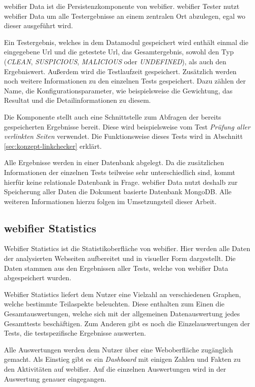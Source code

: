 webifier Data ist die Persistenzkomponente von webifier. webifier Tester nutzt webifier Data um alle Testergebnisse an einem zentralen Ort abzulegen, egal wo dieser ausgeführt wird.

Ein Testergebnis, welches in dem Datamodul gespeichert wird enthält einmal die eingegebene Url und die getestete Url, das Gesamtergebnis, sowohl den Typ (\textit{CLEAN}, \textit{SUSPICIOUS}, \textit{MALICIOUS} oder \textit{UNDEFINED}), als auch den Ergebniswert. Außerdem wird die Testlaufzeit gespeichert. Zusätzlich werden noch weitere Informationen zu den einzelnen Tests gespeichert. Dazu zählen der Name, die Konfigurationsparameter, wie beispielsweise die Gewichtung, das Resultat und die Detailinformationen zu diesem.

Die Komponente stellt auch eine Schnittstelle zum Abfragen der bereits gespeicherten Ergebnisse bereit. Diese wird beispielsweise vom Test \textit{Prüfung aller verlinkten Seiten} verwendet. Die Funktionsweise dieses Tests wird in Abschnitt \ref{sec:konzept-linkchecker} erklärt.

Alle Ergebnisse werden in einer Datenbank abgelegt. Da die zusätzlichen Informationen der einzelnen Tests teilweise sehr unterschiedlich sind, kommt hierfür keine relationale Datenbank in Frage. webifier Data nutzt deshalb zur Speicherung aller Daten die Dokument basierte Datenbank MongoDB. Alle weiteren Informationen hierzu folgen im Umsetzungsteil dieser Arbeit.

\subsection{webifier Statistics}
Webifier Statistics ist die Statistikoberfläche von webifier. Hier werden alle Daten der analysierten Webseiten aufbereitet und in visueller Form dargestellt. Die Daten stammen aus den Ergebnissen aller Tests, welche von webifier Data abgespeichert wurden.

Webifier Statistics liefert dem Nutzer eine Vielzahl an verschiedenen Graphen, welche bestimmte Teilaspekte beleuchten. Diese enthalten zum Einen die Gesamtauswertungen, welche sich mit der allgemeinen Datenauswertung jedes Gesamttests beschäftigen. Zum Anderen gibt es noch die Einzelauswertungen der Tests, die testspezifische Ergebnisse auswerten.

Alle Auswertungen werden dem Nutzer über eine Weboberfläche zugänglich gemacht. Als Einstieg gibt es ein \textit{Dashboard} mit einigen Zahlen und Fakten zu den Aktivitäten auf webifier. Auf die einzelnen Auswertungen wird in der Auswertung genauer eingegangen.


